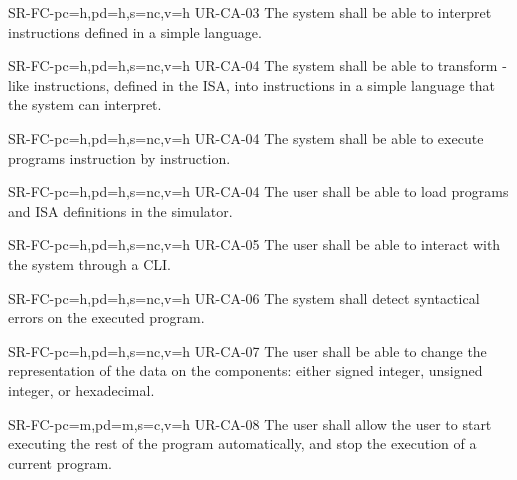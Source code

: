\begin{softwareReq}{SR-FC-}{pc=h,pd=h,s=nc,v=h}
  {UR-CA-03}
  The system shall be able to interpret instructions defined in a simple language.
\end{softwareReq}

\begin{softwareReq}{SR-FC-}{pc=h,pd=h,s=nc,v=h}
  {UR-CA-04}
  The system shall be able to transform -like instructions, defined in the \gls{ISA}, into instructions in a simple language that the system can interpret.
\end{softwareReq}

\begin{softwareReq}{SR-FC-}{pc=h,pd=h,s=nc,v=h}
  {UR-CA-04}
  The system shall be able to execute programs instruction by instruction.
\end{softwareReq}

\begin{softwareReq}{SR-FC-}{pc=h,pd=h,s=nc,v=h}
  {UR-CA-04}
  The user shall be able to load programs and \gls{ISA} definitions in the simulator.
\end{softwareReq}

\begin{softwareReq}{SR-FC-}{pc=h,pd=h,s=nc,v=h}
  {UR-CA-05}
  The user shall be able to interact with the system through a \gls{CLI}.
\end{softwareReq}

\begin{softwareReq}{SR-FC-}{pc=h,pd=h,s=nc,v=h}
  {UR-CA-06}
  The system shall detect syntactical errors on the executed program.
\end{softwareReq}

\begin{softwareReq}{SR-FC-}{pc=h,pd=h,s=nc,v=h}
  {UR-CA-07}
  The user shall be able to change the representation of the data on the components: either signed integer, unsigned integer, or hexadecimal.
\end{softwareReq}

\begin{softwareReq}{SR-FC-}{pc=m,pd=m,s=c,v=h}
  {UR-CA-08}
  The user shall allow the user to start executing the rest of the program automatically, and stop the execution of a current program.
\end{softwareReq}

